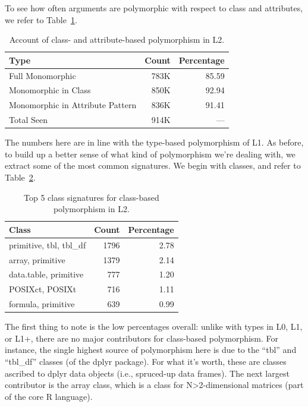 \documentclass[acmsmall,10pt,review,anonymous]{acmart}\settopmatter{printfolios=true,printccs=false,printacmref=false}
\begin{document}
To see how often arguments are polymorphic with respect to class and attributes, we refer to Table~\ref{tab:classcountsL2}.

\begin{table}[ht]
\label{tab:classcountsL2}
\centering
\begin{tabular}{lrr}
  \hline
Type & Count & Percentage \\
  \hline
Full Monomorphic & 783K & 85.59 \\
  Monomorphic in Class & 850K & 92.94 \\
  Monomorphic in Attribute Pattern & 836K & 91.41 \\
  Total Seen & 914K & --- \\
   \hline
\end{tabular}
\caption{Account of class- and attribute-based polymorphism in L2.}
\end{table}

The numbers here are in line with the type-based polymorphism of L1.
As before, to build up a better sense of what kind of polymorphism we're dealing with, we extract some of the most common signatures.
We begin with classes, and refer to Table~\ref{tab:classpolyL2}.

\begin{table}[ht]
\label{tab:classpolyL2}
\centering
\begin{tabular}{lrr}
  \hline
Class & Count & Percentage \\
  \hline
  primitive, tbl, tbl\_df & 1796 & 2.78 \\
  array, primitive & 1379 & 2.14 \\
  data.table, primitive & 777 & 1.20 \\
  POSIXct, POSIXt & 716 & 1.11 \\
  formula, primitive & 639 & 0.99 \\
   \hline
\end{tabular}
\caption{Top 5 class signatures for class-based polymorphism in L2.}
\end{table}

The first thing to note is the low percentages overall: unlike with types in L0, L1, or L1+, there are no major contributors for class-based polymorphism.
For instance, the single highest source of polymorphism here is due to the ``tbl'' and ``tbl\_df'' classes (of the dplyr package).
For what it's worth, these are classes ascribed to dplyr data objects (i.e., spruced-up data frames).
The next largest contributor is the array class, which is a class for N>2-dimensional matrices (part of the core R language).
\end{document}
